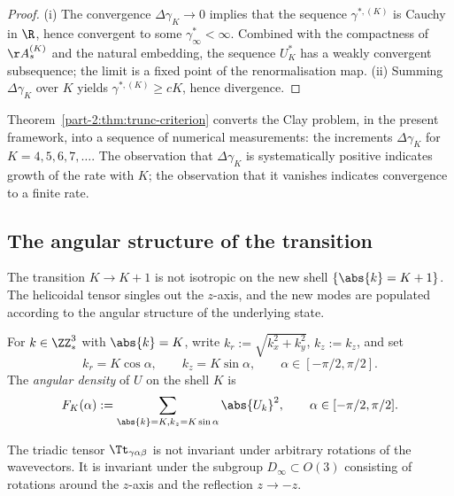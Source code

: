 \begin{proof}
(i) The convergence $\Delta\gamma_K\to 0$ implies that the sequence 
$\gamma^{\ast,(K)}$ is Cauchy in $\R$, hence convergent to some 
$\gamma^\ast_\infty<\infty$. Combined with the compactness of 
$\AA_s^{(K)}$ and the natural embedding, the sequence $U^\ast_K$ has 
a weakly convergent subsequence; the limit is a fixed point of the 
renormalisation map.
(ii) Summing $\Delta\gamma_K$ over $K$ yields 
$\gamma^{\ast,(K)}\geq cK$, hence divergence.
\end{proof}

\begin{remark}\label{part-2:rem:numeric-impl}
Theorem~\ref{part-2:thm:trunc-criterion} converts the Clay problem, in the 
present framework, into a sequence of numerical measurements: the 
increments $\Delta\gamma_K$ for $K = 4,5,6,7,\ldots$. The 
observation that $\Delta\gamma_K$ is systematically positive 
indicates growth of the rate with $K$; the observation that it 
vanishes indicates convergence to a finite rate.
\end{remark}

\subsection{The angular structure of the transition}
\label{part-2:ssec:angular-transition}

The transition $K\to K+1$ is not isotropic on the new shell 
$\{ \abs{k} = K+1\}$. The helicoidal tensor singles out the 
$z$-axis, and the new modes are populated according to the angular 
structure of the underlying state.

\begin{definition}\label{part-2:def:angular}
For $k\in\ZZ^3_\ast$ with $\abs{k}=K$, write 
$k_r := \sqrt{k_x^2+k_y^2}$, $k_z := k_z$, and set
\begin{equation}\label{part-2:eq:angular-coords}
k_r = K\cos\alpha,\qquad
k_z = K\sin\alpha,\qquad
\alpha\in[-\pi/2,\pi/2].
\end{equation}
The \emph{angular density} of $U$ on the shell $K$ is
\begin{equation}\label{part-2:eq:angular-density}
F_K(\alpha) := \sum_{\abs{k}=K, k_z = K\sin\alpha} 
\abs{U_k}^2, \qquad \alpha\in[-\pi/2,\pi/2].
\end{equation}
\end{definition}

\begin{proposition}\label{part-2:prop:non-iso}
The triadic tensor $\Tt_{\gamma\alpha\beta}$ is not invariant under 
arbitrary rotations of the wavevectors. It is invariant under the 
subgroup $D_\infty\subset O(3)$ consisting of rotations around the 
$z$-axis and the reflection $z\to -z$.
\end{proposition}

